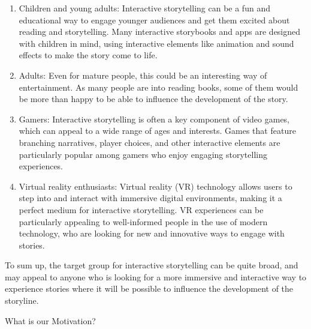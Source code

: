  \begin{enumerate}
                 \item Children and young adults: Interactive storytelling can be a fun and educational way to engage younger audiences and get them excited about reading and storytelling. Many interactive storybooks and apps are designed with children in mind, using interactive elements like animation and sound effects to make the story come to life.
                 \item Adults: Even for mature people, this could be an interesting way of entertainment. As many people are into reading books, some of them would be more than happy to be able to influence the development of the story.
                 \item Gamers: Interactive storytelling is often a key component of video games, which can appeal to a wide range of ages and interests. Games that feature branching narratives, player choices, and other interactive elements are particularly popular among gamers who enjoy engaging storytelling experiences.
                 \item Virtual reality enthusiasts: Virtual reality (VR) technology allows users to step into and interact with immersive digital environments, making it a perfect medium for interactive storytelling. VR experiences can be particularly appealing to well-informed people in the use of modern technology, who are looking for new and innovative ways to engage with stories.
 \end{enumerate}

 To sum up, the target group for interactive storytelling can be quite broad, and may appeal to anyone who is looking for a more immersive and interactive way to experience stories where it will be possible to influence the development of the storyline.

 What is our Motivation?
 
